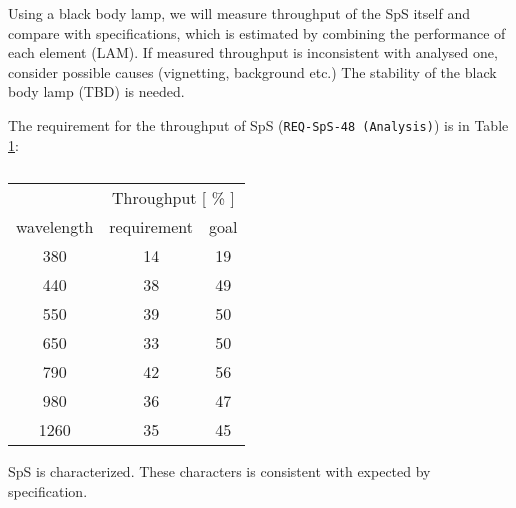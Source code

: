 \smallskip

Using a black body lamp, we will measure throughput of the SpS itself and compare with specifications, which is estimated by combining the performance of each element (LAM).
If measured throughput is inconsistent with analysed one, consider possible causes (vignetting, background etc.) 
The stability of the black body lamp (TBD) is needed.

The requirement for the throughput of SpS ({\tt REQ-SpS-48 (Analysis)}) is in Table \ref{tab:SpSthroughput}:
\begin{table}[!ht]
\label{tab:SpSthroughput}
\begin{center}
\caption{}
\begin{tabular}{c|cc}  \hline
 & \multicolumn{2}{c}{Throughput [ \% ]} \\
wavelength &  requirement & goal \\ \hline \hline
380 & 14 & 19 \\
440 & 38 & 49 \\
550 & 39 & 50 \\
650 & 33 & 50 \\
790 & 42 & 56 \\
980 & 36 & 47 \\
1260 & 35 & 45 \\  \hline
\end{tabular}
\end{center}
\end{table}

\begin{itembox}[l]{}
SpS is characterized. These characters is consistent with expected by specification.
\end{itembox}